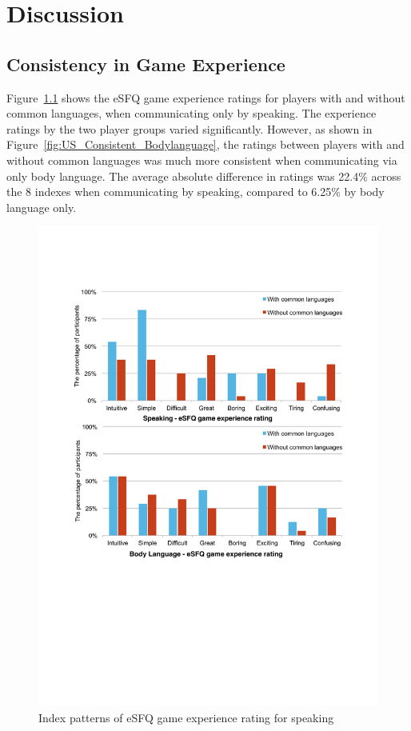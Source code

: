 \chapter{Discussion}

\section{Consistency in Game Experience}


Figure~\ref{fig:US_Consistent_Speaking} shows the eSFQ game experience ratings for players with and without common languages, when communicating only by speaking. The experience ratings by the two player groups varied significantly. However, as shown in Figure~\ref{fig:US_Consistent_Bodylanguage}, the ratings between players with and without common languages was much more consistent when communicating via only body language. The average absolute difference in ratings was 22.4\% across the 8 indexes when communicating by speaking, compared to 6.25\% by body language only.

\begin{figure}[!h]
\centering
\includegraphics[width=1.0\columnwidth]{Figures/US_Consistent_Speaking.pdf}
\caption{Index patterns of eSFQ game experience rating for speaking}
\label{fig:US_Consistent_Speaking}
\end{figure}

